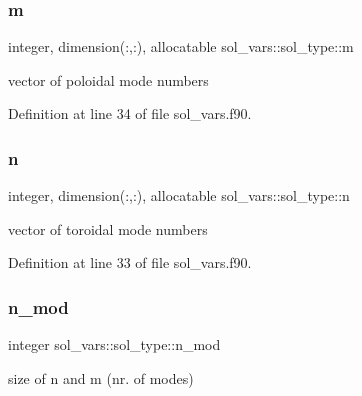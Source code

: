 \mbox{\label{structsol__vars_1_1sol__type_ad00b40efc03a825e83a58b6ef6b29e2b}} 
\subsubsection{\texorpdfstring{m}{m}}
{\footnotesize\ttfamily integer, dimension(\+:,\+:), allocatable sol\+\_\+vars\+::sol\+\_\+type\+::m}



vector of poloidal mode numbers 



Definition at line 34 of file sol\+\_\+vars.\+f90.

\mbox{\label{structsol__vars_1_1sol__type_acb5f4ea951583b240591bce4e32f5230}} 
\subsubsection{\texorpdfstring{n}{n}}
{\footnotesize\ttfamily integer, dimension(\+:,\+:), allocatable sol\+\_\+vars\+::sol\+\_\+type\+::n}



vector of toroidal mode numbers 



Definition at line 33 of file sol\+\_\+vars.\+f90.

\mbox{\label{structsol__vars_1_1sol__type_a05faca84fd837b32985ae5c4fdadb6da}} 
\subsubsection{\texorpdfstring{n\+\_\+mod}{n\_mod}}
{\footnotesize\ttfamily integer sol\+\_\+vars\+::sol\+\_\+type\+::n\+\_\+mod}



size of n and m (nr. of modes) 



